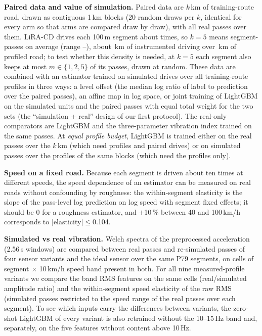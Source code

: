 \textbf{Paired data and value of simulation.}
Paired data are $k$\,km of training-route road, drawn as contiguous 1\,km blocks (20 random draws per $k$, identical for every arm so that arms are compared draw by draw), with all real passes over them.
LiRA-CD drives each 100\,m segment about \kdPassesFive{} times, so $k=5$ means \kdUnitsFive{} segment-passes on average (range \kdUnitsFiveMin--\kdUnitsFiveMax), about \kdDriveKmFive\,km of instrumented driving over \kdKmFive\,km of profiled road; to test whether this density is needed, at $k=5$ each segment also keeps at most $m\in\{1,2,5\}$ of its passes, drawn at random.
These data are combined with an estimator trained on simulated drives over all training-route profiles in three ways: a level offset (the median log ratio of label to prediction over the paired passes), an affine map in log space, or joint training of LightGBM on the simulated units and the paired passes with equal total weight for the two sets (the ``simulation + real'' design of our first protocol).
The real-only comparators are LightGBM and the three-parameter vibration index trained on the same passes.
At \emph{equal profile budget}, LightGBM is trained either on the real passes over the $k$\,km (which need profiles and paired drives) or on simulated passes over the profiles of the same blocks (which need the profiles only).

\textbf{Speed on a fixed road.}
Because each segment is driven about ten times at different speeds, the speed dependence of an estimator can be measured on real roads without confounding by roughness: the within-segment elasticity is the slope of the pass-level log prediction on log speed with segment fixed effects; it should be 0 for a roughness estimator, and $\pm$10\,\% between 40 and 100\,km/h corresponds to $|$elasticity$|\le$0.104.

\textbf{Simulated vs real vibration.}
Welch spectra of the preprocessed acceleration (2.56\,s windows) are compared between real passes and re-simulated passes of four sensor variants and the ideal sensor over the same P79 segments, on cells of segment $\times$ 10\,km/h speed band present in both.
For all nine measured-profile variants we compare the band RMS features on the same cells (real/simulated amplitude ratio) and the within-segment speed elasticity of the raw RMS (simulated passes restricted to the speed range of the real passes over each segment).
To see which inputs carry the differences between variants, the zero-shot LightGBM of every variant is also retrained without the 10--15\,Hz band and, separately, on the five features without content above 10\,Hz.

